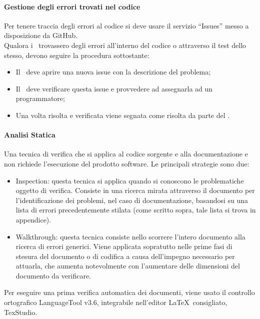\documentclass[../NormeDiProgetto.tex]{subfiles}
\begin{document}
				\paragraph{Gestione degli errori trovati nel codice\\}\label{GestioneErroriCodice}
					Per tenere traccia degli errori al codice si deve usare il servizio ``Issues'' messo a
					disposizione da GitHub.\\
					Qualora i \verificatori\ trovassero degli errori all'interno del codice o attraverso il
					test dello stesso, devono seguire la procedura sottostante:
					\begin{itemize}
						\item Il \verificatore\ deve aprire una nuova issue con la descrizione
						del problema;
						\item Il \responsabilediprogetto\ deve verificare questa issue e provvedere ad
						assegnarla ad un programmatore;
						\item Una volta risolta e verificata viene segnata come risolta da parte
						del \responsabilediprogetto.
					\end{itemize}
				\paragraph{Analisi Statica\\}
					Una tecnica di verifica che si applica al codice sorgente e alla documentazione
					e non richiede l'esecuzione del prodotto software.
					Le principali strategie sono due:
					\begin{itemize}
						\item Inspection: questa tecnica si applica quando si conoscono le
						problematiche oggetto di verifica. Consiste in una ricerca mirata attraverso il
						documento per l'identificazione dei problemi, nel caso di documentazione,
						basandosi su una lista di errori precedentemente stilata
						(come scritto sopra, tale lista si trova in appendice).
						\item Walkthrough: questa tecnica consiste nello scorrere l'intero
						documento alla ricerca di errori generici. Viene applicata sopratutto nelle
						prime fasi di stesura del documento o di codifica a causa dell'impegno
						necessario per attuarla, che aumenta notevolmente con l'aumentare delle
						dimensioni del documento da verificare.
					\end{itemize}
					Per eseguire una prima verifica automatica dei documenti, viene usato il controllo
					ortografico	LanguageTool v3.6, integrabile nell'editor \LaTeX\ consigliato, TexStudio.
\end{document}

